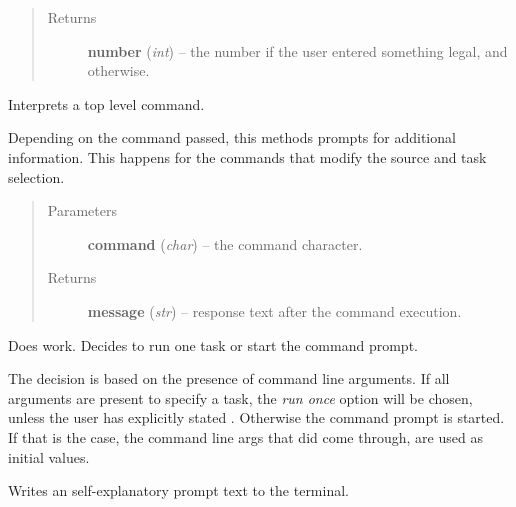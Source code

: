 \documentclass[letterpaper,10pt,english]{sphinxmanual}
\begin{document}
\begin{fulllineitems}
\begin{fulllineitems}
\begin{quote}
\begin{description}
\item[{Returns}] \leavevmode
\textbf{number} (\emph{int}) --
the number if the user entered something legal,
and  otherwise.

\end{description}\end{quote}

\end{fulllineitems}


\begin{fulllineitems}
\label{graf/graf:graf.Shell.main_command}
Interprets a top level command.

Depending on the command passed, this methods prompts for additional information.
This happens for the commands that modify the source and task selection.
\begin{quote}\begin{description}
\item[{Parameters}] \leavevmode
\textbf{command} (\emph{char}) --
the command character.

\item[{Returns}] \leavevmode
\textbf{message} (\emph{str}) --
response text after the command execution.

\end{description}\end{quote}

\end{fulllineitems}


\begin{fulllineitems}
\label{graf/graf:graf.Shell.processor}
Does work. Decides to run one task or start the command prompt.

The decision is based on the presence of command line arguments.
If all arguments are present to specify a task, the \emph{run once} option will be chosen,
unless the user has explicitly stated .
Otherwise the command prompt is started. If that is the case, the
command line args that did come through, are used as initial values.

\end{fulllineitems}


\begin{fulllineitems}
\label{graf/graf:graf.Shell.prompt}
Writes an self-explanatory prompt text to the terminal.


\end{fulllineitems}
\end{fulllineitems}
\end{document}
